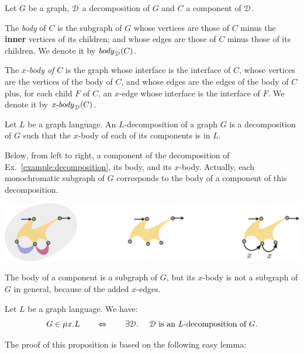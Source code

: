  \begin{definition}
Let $G$ be a graph, $\mathcal D$ a decomposition of $G$ and $C$ a component of $\mathcal D$. 
\smallskip

The \emph{body} of $C$ is the subgraph of $G$ whose vertices are those of $C$ minus the \textbf{inner} vertices of its children; and whose edges are those of $C$ minus those of its children. We denote it by  $\mathsf{body}_\cD(C)$.  
\smallskip

The \emph{$x$-body of $C$} is the graph whose interface is the interface of $C$, whose vertices are the vertices of the body of $C$, and whose edges are the edges of the body of $C$ plus, for each child $F$ of $C$, an $x$-edge whose interface is the interface of $F$.  We denote it  by $x\text{-}\mathsf{body}_\cD(C)$.
\end{definition}

\begin{definition}[$L$-decompositions]
Let $L$ be a graph language. An $L$-decomposition of a graph $G$ is a decomposition of $G$ such that the $x$-body of each of its components is in $L$.
\end{definition}

\begin{example}
Below, from left to right, a component of the decomposition of Ex.~\ref{example:decomposition}, its body, and its $x$-body. Actually, each monochromatic subgraph of $G$ corresponds to the body of a  component of this decomposition.
\begin{center}
\includegraphics[scale=.10]{Pictures/body}
\end{center}
\end{example}
\begin{remark}
The body of a component is a subgraph of $G$, but its $x$-body is not a subgraph of $G$ in general, because of the added $x$-edges.
\end{remark}


 

\begin{proposition}\label{lem:decomp-iteration}
Let $L$ be a graph language. We have:
$$ G\in \mu x. L \qquad \Leftrightarrow \qquad \exists \mathcal D. \ \quad\mathcal D \text{ is an $L$-decomposition of $G$.}$$
\end{proposition} 
The proof of this proposition is based on the following easy lemma:

